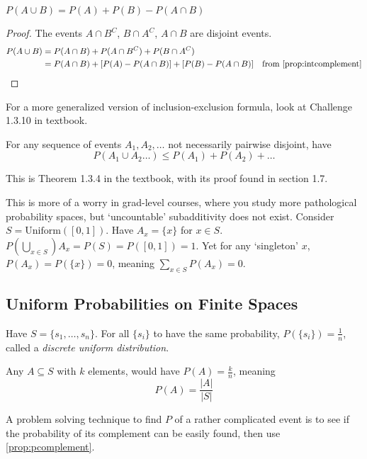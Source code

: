 \begin{simplethm}
    $P(A \cup B) = P(A) + P(B) - P(A \cap B)$ \label{prop:inclexcl} 
\end{simplethm}
\begin{proof}
The events $A \cap B^C$, $B \cap A^C$, $A \cap B$ are disjoint events. 
\begin{align*}
    P(A \cup B) &= P(A \cap B) + P(A \cap B^C) + P(B \cap A^C) \\
    &= P(A \cap B) + [P(A) - P(A \cap B)] + [P(B) - P(A \cap B)] & \text{from } \ref{prop:intcomplement}
\end{align*}
\end{proof}
\noindent For a more generalized version of inclusion-exclusion formula, look at Challenge 1.3.10 in textbook.

\begin{simplethm}[Subadditivity] \label{thm:subadditivity}
For any sequence of events $A_1, A_2, \dots$ not necessarily pairwise disjoint, have
\[
    P(A_1 \cup A_2 \dots) \leq P(A_1) + P(A_2) + \dots
\]
\end{simplethm}

This is Theorem 1.3.4 in the textbook, with its proof found in section 1.7.

\begin{remark}
    This is more of a worry in grad-level courses, where you study more pathological probability spaces, but `uncountable' subadditivity does not exist. Consider $S = \text{Uniform}([0, 1])$. Have $A_x = \{ x \}$ for $x \in S$. $P(\bigcup_{x \in S}) A_x = P(S) = P([0, 1]) = 1$. Yet for any `singleton' $x$, $P(A_x) = P(\{ x \}) = 0$, meaning $\sum_{x \in S} P(A_x) = 0$.
\end{remark}

\subsection{Uniform Probabilities on Finite Spaces}
Have $S = \{ s_1, \dots ,s_n \}$. For all $\{ s_i \}$ to have the same probability, $P(\{ s_i \}) = \frac{1}{n}$, called a \textit{discrete uniform distribution}. 

Any $A \subseteq S$ with $k$ elements, would have $P(A) = \frac{k}{n}$, meaning
\[
P(A) = \frac{|A|}{|S|}
\]

A problem solving technique to find $P$ of a rather complicated event is to see if the probability of its complement can be easily found, then use \ref{prop:pcomplement}.
